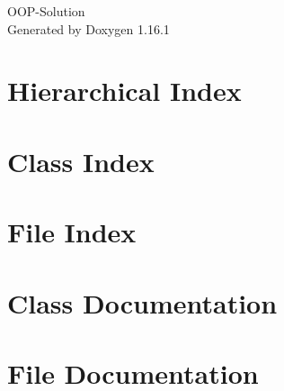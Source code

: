\documentclass[twoside]{book}
\newcommand{\+}{\discretionary{\mbox{\scriptsize$\hookleftarrow$}}{}{}}
\newcommand{\clearemptydoublepage}{%
    \newpage{\pagestyle{empty}\cleardoublepage}%
  }
\begin{document}
  \raggedbottom
    \hypersetup{pageanchor=false,
                bookmarksnumbered=true,
                pdfencoding=unicode
               }
  \begin{titlepage}
  \vspace*{7cm}
  \begin{center}%
  {\Large OOP-\/\+Solution}\\
  \vspace*{1cm}
  {\large Generated by Doxygen 1.16.1}\\
  \end{center}
  \end{titlepage}
  \clearemptydoublepage
  \tableofcontents
  \clearemptydoublepage
  \hypersetup{pageanchor=true}
\chapter{Hierarchical Index}

\chapter{Class Index}

\chapter{File Index}

\chapter{Class Documentation}







\chapter{File Documentation}







  \backmatter
  \newpage
  \clearemptydoublepage
  \printindex
\end{document}
